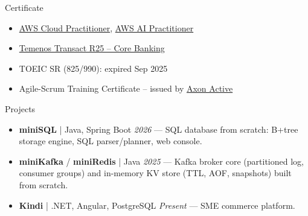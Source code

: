 \documentclass{resume} %
\begin{document}
\begin{rSection}{Certificate}
\begin{itemize}
    \item \href{https://www.credly.com/badges/f28440e9-17d0-4ce7-9bed-f470b18ecdb0/public_url}{AWS Cloud Practitioner}, \href{https://www.credly.com/badges/43f21751-5e44-489f-801f-82ae1828bd55/public_url}{AWS AI Practitioner}
    \item \href{https://drive.google.com/drive/folders/19Kph3-xM5VB-MjKf3lTdFb30IIcpy9yU?usp=sharing}{Temenos Transact R25 -- Core Banking}
    \item TOEIC SR (825/990): expired Sep 2025
    \item Agile-Scrum Training Certificate -- issued by \href{https://www.axonactive.com}{Axon Active}
\end{itemize}
\end{rSection}

\begin{rSection}{Projects}
\begin{itemize}
    \item \textbf{miniSQL} | Java, Spring Boot \hfill {\em 2026} --- SQL database from scratch: B+tree storage engine, SQL parser/planner, web console.
    \item \textbf{miniKafka} / \textbf{miniRedis} | Java \hfill {\em 2025} --- Kafka broker core (partitioned log, consumer groups) and in-memory KV store (TTL, AOF, snapshots) built from scratch.
    \item \textbf{Kindi} | .NET, Angular, PostgreSQL \hfill {\em Present} --- SME commerce platform.
\end{itemize}
\end{rSection}
\end{document}
